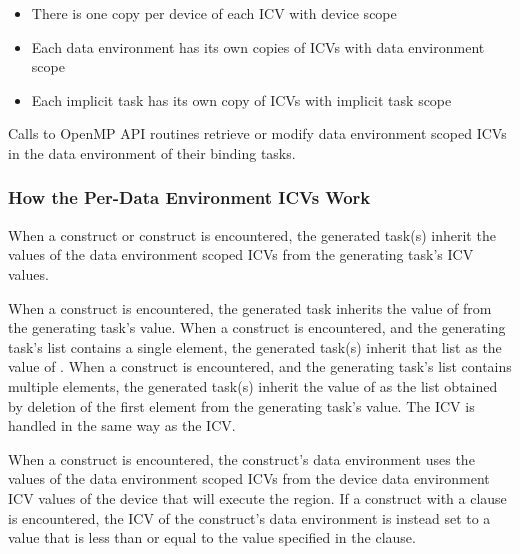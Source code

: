 \comments
\begin{itemize}
\item There is one copy per device of each ICV with device scope

\item Each data environment has its own copies of ICVs with data environment scope

\item Each implicit task has its own copy of ICVs with implicit task scope 
\end{itemize}

Calls to OpenMP API routines retrieve or modify data environment scoped ICVs in the 
data environment of their binding tasks.










\subsubsection{How the Per-Data Environment ICVs Work}
\label{subsubsec:How the Per-Data Environment ICVs Work}
When a  construct or  construct is encountered, the generated task(s)
inherit the values of the data environment scoped ICVs from the generating task's ICV
values.

When a  construct is encountered, the generated task inherits the value of
 from the generating task's  value. When a 
construct is encountered, and the generating task's  list contains a single
element, the generated task(s) inherit that list as the value of . When a
 construct is encountered, and the generating task's  list contains 
multiple elements, the generated task(s) inherit the value of  as the list 
obtained by deletion of the first element from the generating task's  value. 
The  ICV is handled in the same way as the  ICV.

When a  construct is encountered, the construct's data environment
uses the values of the data environment scoped ICVs from the device data environment ICV values of the device that will execute the region. 
If a  construct with a  clause is encountered, 
the  ICV of the construct's data environment is instead set to a value that is less than or equal to the value specified in the clause.  

